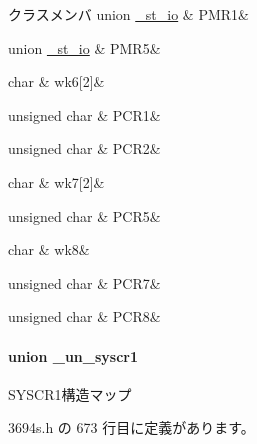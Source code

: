 \begin{DoxyFields}{クラスメンバ}
union \hyperlink{3694s_8h_d9/da2/union__st__io_8PMR1}{\+\_\+st\+\_\+io}\label{3694s_8h_a7f920e21b4918cb85bf20035b6cfddc4}
&
P\+M\+R1&
\\
\hline

union \hyperlink{3694s_8h_d9/deb/union__st__io_8PMR5}{\+\_\+st\+\_\+io}\label{3694s_8h_aa34dd7431875cf11d07daee8c6f9a1ba}
&
P\+M\+R5&
\\
\hline

char\label{3694s_8h_a680fb4638051e0fb86bdbf79fef4e28e}
&
wk6\mbox{[}2\mbox{]}&
\\
\hline

unsigned char\label{3694s_8h_a36ea355218f3affa625c66a99ce7f3ab}
&
P\+C\+R1&
\\
\hline

unsigned char\label{3694s_8h_a3bbd6b491b69b157d955d7022d02272e}
&
P\+C\+R2&
\\
\hline

char\label{3694s_8h_a3692ca7c89e781244fc0b809d1b04488}
&
wk7\mbox{[}2\mbox{]}&
\\
\hline

unsigned char\label{3694s_8h_afa1d67a0347546d1c06e93147fdebdb1}
&
P\+C\+R5&
\\
\hline

char\label{3694s_8h_a741dc05f6d45d820aaab8e9aeee5b06e}
&
wk8&
\\
\hline

unsigned char\label{3694s_8h_aab39aff092248c4f37786525786dfee5}
&
P\+C\+R7&
\\
\hline

unsigned char\label{3694s_8h_a7ff6521f980dd01787dfcaf7cc56068a}
&
P\+C\+R8&
\\
\hline

\end{DoxyFields}
\label{union__un__syscr1}
\paragraph{union \+\_\+un\+\_\+syscr1}
S\+Y\+S\+C\+R1構造マップ 

 3694s.\+h の 673 行目に定義があります。



